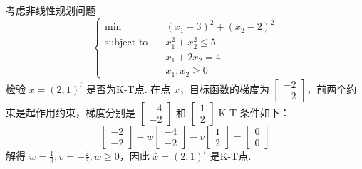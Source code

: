 

\newcommand\Title{最优化方法第10次作业}

\newcommand\subject{\operatorname{subject\ to}}



\begin{problem}[P243 2]
    考虑非线性规划问题
    \[\begin{cases}
        \min \quad &(x_1 - 3)^2 + (x_2 - 2)^2\\
        \subject \quad &x_1^2 + x_2^2 \le 5\\
        &x_1 + 2x_2 = 4\\
        &x_1, x_2 \ge 0
    \end{cases}\]
    检验 $\bar{x} = (2, 1)^t$ 是否为K-T点.
    \Answer 在点 $\bar{x}$，目标函数的梯度为 $\begin{bmatrix}
        -2 \\ -2
    \end{bmatrix}$，前两个约束是起作用约束，梯度分别是 $\begin{bmatrix}
        -4\\-2
    \end{bmatrix}$ 和 $\begin{bmatrix}
        1\\2
    \end{bmatrix}$.K-T 条件如下：\[\left[\begin{array}{l} -2 \\ -2
        \end{array}\right]-w\left[\begin{array}{l} -4 \\ -2
        \end{array}\right]-v\left[\begin{array}{l} 1 \\ 2
        \end{array}\right]=\left[\begin{array}{l} 0 \\ 0
        \end{array}\right]\]解得 $w = \frac{1}{3}, v = -\frac{2}{3}, w \ge 0$，因此 $\bar{x} = (2, 1)^t$ 是K-T点.
\end{problem}

